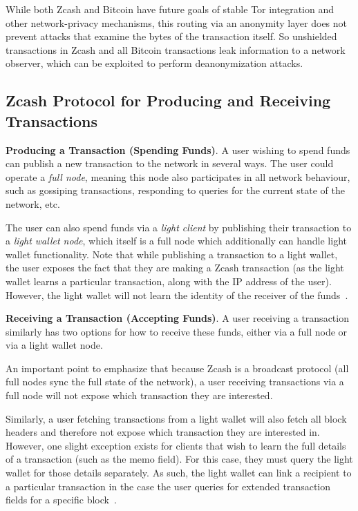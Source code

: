 \documentclass{article}
\begin{document}
While both Zcash and Bitcoin have future goals of
stable Tor integration and other network-privacy mechanisms, this routing via
an anonymity layer does not prevent attacks that examine the bytes of the
transaction itself. So unshielded transactions in Zcash and all Bitcoin
transactions leak information to a network observer, which can be exploited to
perform deanonymization attacks.

\subsection{Zcash Protocol for Producing and Receiving Transactions}

\textbf{Producing a Transaction (Spending Funds)}.
A user wishing to spend
funds can publish a new transaction to the network in several ways. The user
could operate a \emph{full node}, meaning this node also participates in all
network behaviour, such as gossiping transactions, responding to queries for
the current state of the network, etc.

The user can also spend funds via a \emph{light
client} by publishing their transaction to a
\emph{light wallet node}, which itself is a full node which additionally can handle
light wallet functionality. Note that while publishing a transaction to a light
wallet, the user exposes the fact that they are making a Zcash transaction (as
the light wallet learns a particular transaction, along with the IP address of
the user). However, the light wallet will not learn the identity of the
receiver of the funds~\cite{light-wallet-spec}.

\textbf{Receiving a Transaction (Accepting Funds)}. A user receiving a
transaction similarly has two options for how to receive these funds, either
via a full node or via a light wallet node.

An important point to emphasize that because Zcash is a broadcast protocol (all
full nodes sync the full state of the network), a user receiving transactions
via a full node will not expose which transaction they are interested.

Similarly, a user fetching transactions from a light wallet will also fetch all
block headers and therefore not expose which transaction they are interested
in. However, one slight exception exists for clients that wish
to learn the full details of a transaction (such as the memo field). For this
case,
they must query the light wallet for those details separately. As such, the
light wallet can link a recipient to a particular transaction in the case the
user queries for extended transaction fields for a specific block~\cite{light-wallet-spec}.
\end{document}
